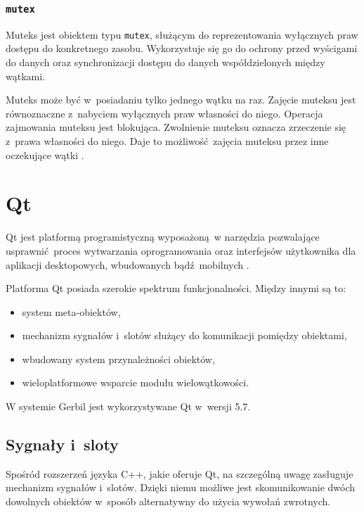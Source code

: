  \subsubsection{\lstinline$mutex$}
Muteks jest obiektem typu \lstinline$mutex$, służącym do reprezentowania wyłącznych praw dostępu do konkretnego zasobu. Wykorzystuje się go do ochrony przed wyścigami do danych oraz synchronizacji dostępu do danych współdzielonych między wątkami.

Muteks może być w~posiadaniu tylko jednego wątku na raz. Zajęcie muteksu jest równoznaczne z~nabyciem wyłącznych praw własności do niego. Operacja zajmowania muteksu jest blokująca. Zwolnienie muteksu oznacza zrzeczenie się z~prawa własności do niego. Daje to możliwość zajęcia muteksu przez inne oczekujące wątki \cite{Stroustrup}.


 \section{Qt}

Qt jest platformą programistyczną wyposażoną w narzędzia pozwalające usprawnić proces wytwarzania oprogramowania oraz interfejsów użytkownika dla aplikacji desktopowych, wbudowanych bądź mobilnych \cite{Qtdoc}.

Platforma Qt posiada szerokie spektrum funkcjonalności. Między innymi są to:
\begin{itemize}
	\item system meta-obiektów,
	\item mechanizm sygnałów i~slotów służący do komunikacji pomiędzy obiektami,
	\item wbudowany system przynależności obiektów,
	\item wieloplatformowe wsparcie modułu wielowątkowości.
		
\end{itemize}

W systemie Gerbil jest wykorzystywane Qt w~wersji 5.7.

  \subsection{Sygnały i~sloty}

Spośród rozszerzeń języka C++, jakie oferuje Qt, na szczególną uwagę zasługuje mechanizm sygnałów i~slotów. Dzięki niemu możliwe jest skomunikowanie dwóch dowolnych obiektów w~sposób alternatywny do użycia wywołań zwrotnych. 

